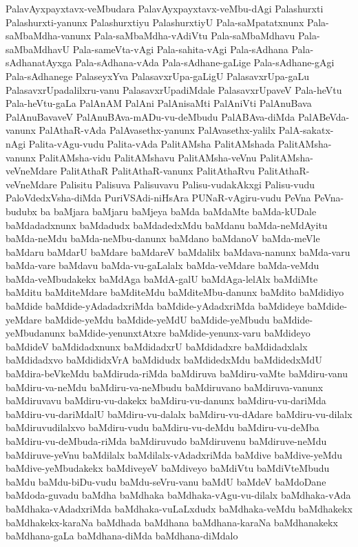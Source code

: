 {PalavAyxpayxtavx-veMbudara
PalavAyxpayxtavx-veMbu-dAgi
Palashurxti
Palashurxti-yanunx
Palashurxtiyu
PalashurxtiyU
Pala-saMpatatxnunx
Pala-saMbaMdha-vanunx
Pala-saMbaMdha-vAdiVtu
Pala-saMbaMdhavu
Pala-saMbaMdhavU
Pala-sameVta-vAgi
Pala-sahita-vAgi
Pala-sAdhana
Pala-sAdhanatAyxga
Pala-sAdhana-vAda
Pala-sAdhane-gaLige
Pala-sAdhane-gAgi
Pala-sAdhanege
PalaseyxYva
PalasavxrUpa-gaLigU
PalasavxrUpa-gaLu
PalasavxrUpadalilxru-vanu
PalasavxrUpadiMdale
PalasavxrUpaveV
Pala-heVtu
Pala-heVtu-gaLa
PalAnAM
PalAni
PalAnisaMti
PalAniVti
PalAnuBava
PalAnuBavaveV
PalAnuBAva-mADu-vu-deMbudu
PalABAva-diMda
PalABeVda-vanunx
PalAthaR-vAda
PalAvasethx-yanunx
PalAvasethx-yalilx
PalA-sakatx-nAgi
Palita-vAgu-vudu
Palita-vAda
PalitAMsha
PalitAMshada
PalitAMsha-vanunx
PalitAMsha-vidu
PalitAMshavu
PalitAMsha-veVnu
PalitAMsha-veVneMdare
PalitAthaR
PalitAthaR-vanunx
PalitAthaRvu
PalitAthaR-veVneMdare
Palisitu
Palisuva
Palisuvavu
Palisu-vudakAkxgi
Palisu-vudu
PaloVdedxVsha-diMda
PuriVSAdi-niHsAra
PUNaR-vAgiru-vudu
PeVna
PeVna-budubx
ba
baMjara
baMjaru
baMjeya
baMda
baMdaMte
baMda-kUDale
baMdadadxnunx
baMdadudx
baMdadedxMdu
baMdanu
baMda-neMdAyitu
baMda-neMdu
baMda-neMbu-danunx
baMdano
baMdanoV
baMda-meVle
baMdaru
baMdarU
baMdare
baMdareV
baMdalilx
baMdava-nanunx
baMda-varu
baMda-vare
baMdavu
baMda-vu-gaLalalx
baMda-veMdare
baMda-veMdu
baMda-veMbudakekx
baMdAga
baMdA-galU
baMdAga-lelAlx
baMdiMte
baMditu
baMditeMdare
baMditeMdu
baMditeMbu-danunx
baMdito
baMdidiyo
baMdide
baMdide-yAdadadxriMda
baMdide-yAdadxriMda
baMdideye
baMdide-yeMdare
baMdide-yeMdu
baMdide-yeMdU
baMdide-yeMbudu
baMdide-yeMbudanunx
baMdide-yenunxtAtxre
baMdide-yenunx-varu
baMdideyo
baMdideV
baMdidadxnunx
baMdidadxrU
baMdidadxre
baMdidadxlalx
baMdidadxvo
baMdididxVrA
baMdidudx
baMdidedxMdu
baMdidedxMdU
baMdira-beVkeMdu
baMdiruda-riMda
baMdiruva
baMdiru-vaMte
baMdiru-vanu
baMdiru-va-neMdu
baMdiru-va-neMbudu
baMdiruvano
baMdiruva-vanunx
baMdiruvavu
baMdiru-vu-dakekx
baMdiru-vu-danunx
baMdiru-vu-dariMda
baMdiru-vu-dariMdalU
baMdiru-vu-dalalx
baMdiru-vu-dAdare
baMdiru-vu-dilalx
baMdiruvudilalxvo
baMdiru-vudu
baMdiru-vu-deMdu
baMdiru-vu-deMba
baMdiru-vu-deMbuda-riMda
baMdiruvudo
baMdiruvenu
baMdiruve-neMdu
baMdiruve-yeVnu
baMdilalx
baMdilalx-vAdadxriMda
baMdive
baMdive-yeMdu
baMdive-yeMbudakekx
baMdiveyeV
baMdiveyo
baMdiVtu
baMdiVteMbudu
baMdu
baMdu-biDu-vudu
baMdu-seVru-vanu
baMdU
baMdeV
baMdoDane
baMdoda-guvadu
baMdha
baMdhaka
baMdhaka-vAgu-vu-dilalx
baMdhaka-vAda
baMdhaka-vAdadxriMda
baMdhaka-vuLaLxdudx
baMdhaka-veMdu
baMdhakekx
baMdhakekx-karaNa
baMdhada
baMdhana
baMdhana-karaNa
baMdhanakekx
baMdhana-gaLa
baMdhana-diMda
baMdhana-diMdalo
}
